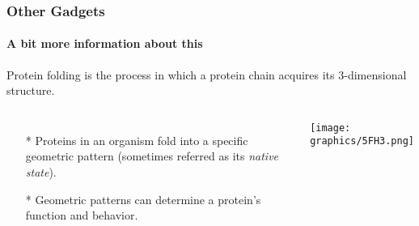 \documentclass{beamer}
\begin{document}
  \begin{frame}
    \frametitle{Other Gadgets}
    \framesubtitle{A bit more information about this}
      Protein folding is the process in which a protein chain acquires its 3-dimensional structure.
    \begin{columns}[c]
     \begin{itemize}
     	\item[*] Proteins in an organism fold into a specific geometric pattern (sometimes referred as its \textit{native state}).
     	\item[*] Geometric patterns can determine a protein's function and behavior. 
     \end{itemize}
	     \begin{minipage}{\linewidth}
			\begin{center}
			\texttt{[image: graphics/5FH3.png]}
			\end{center}
		\end{minipage}
    \end{columns}
  \end{frame}
\end{document}
